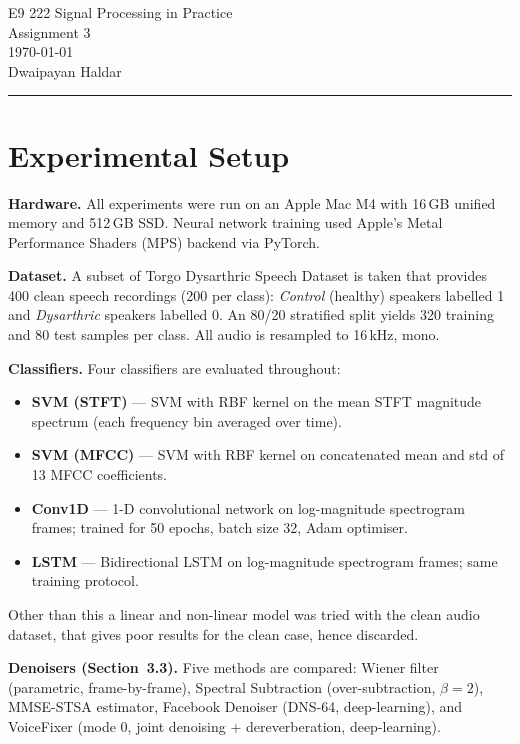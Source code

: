 \documentclass[12pt,a4paper,onecolumn]{exam}
\begin{document}
\begingroup
    \centering
    \LARGE E9 222 Signal Processing in Practice\\
    \LARGE Assignment 3 \\[0.5em]
    \large \today\\[0.5em]
    \large Dwaipayan Haldar \par
\endgroup
\noindent\rule{\textwidth}{0.5pt}
\printanswers
\renewcommand{\solutiontitle}{\noindent\textbf{Ans:}\enspace}
\setlength{\parskip}{3pt}

\section*{Experimental Setup}

\noindent\textbf{Hardware.}
All experiments were run on an Apple Mac M4 with 16\,GB unified memory and 512\,GB SSD.
Neural network training used Apple's Metal Performance Shaders (MPS) backend via PyTorch.

\noindent\textbf{Dataset.}
A subset of Torgo Dysarthric Speech Dataset is taken that provides 400 clean speech recordings
(200 per class): \emph{Control} (healthy) speakers labelled 1 and
\emph{Dysarthric} speakers labelled 0. An 80/20 stratified split yields 320 training and 80 test samples per class.
All audio is resampled to 16\,kHz, mono.

\noindent\textbf{Classifiers.}
Four classifiers are evaluated throughout:
\begin{itemize}\setlength\itemsep{0pt}
  \item \textbf{SVM (STFT)} --- SVM with RBF kernel on the mean STFT magnitude spectrum (each frequency bin averaged over time).
  \item \textbf{SVM (MFCC)} --- SVM with RBF kernel on concatenated mean and std of 13 MFCC coefficients.
  \item \textbf{Conv1D} --- 1-D convolutional network on log-magnitude spectrogram frames; trained for 50 epochs, batch size 32, Adam optimiser.
  \item \textbf{LSTM} --- Bidirectional LSTM on log-magnitude spectrogram frames; same training protocol.
\end{itemize}
Other than this a linear and non-linear model was tried with the clean audio dataset, that gives poor results for the clean case, hence discarded. 

\noindent\textbf{Denoisers (Section~3.3).}
Five methods are compared:
Wiener filter (parametric, frame-by-frame),
Spectral Subtraction (over-subtraction, $\beta=2$),
MMSE-STSA estimator,
Facebook Denoiser (DNS-64, deep-learning),
and VoiceFixer (mode 0, joint denoising + dereverberation, deep-learning).
\end{document}

